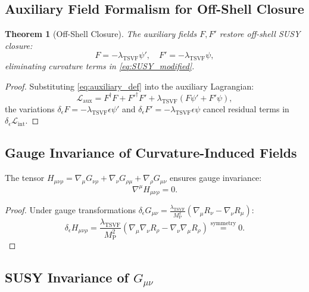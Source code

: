 \documentclass[12pt, onecolumn]{article}
\newtheorem{theorem}{Theorem}[section]
\theoremstyle{definition}
\newcommand{\tsvf}{\lambda_{\mathrm{TSVF}}}
\newcommand{\Mp}{M_{\mathrm{P}}}
\numberwithin{equation}{section}
\begin{document}
\subsection{Auxiliary Field Formalism for Off-Shell Closure} 
\label{subsec:auxiliary_fields}

\begin{theorem}[Off-Shell Closure]
\label{thm:off_shell}
The auxiliary fields \(F, F'\) restore off-shell SUSY closure:
\begin{equation}
F = -\tsvf \psi', \quad F' = -\tsvf \psi,
\label{eq:auxiliary_def}
\end{equation}
eliminating curvature terms in \eqref{eq:SUSY_modified}.
\end{theorem}

\begin{proof}
Substituting \eqref{eq:auxiliary_def} into the auxiliary Lagrangian:
\begin{equation}
\mathcal{L}_{\text{aux}} = F^\dagger F + F'^\dagger F' + \tsvf (F \psi' + F' \psi),
\label{eq:L_auxiliary}
\end{equation}
the variations \(\delta_\epsilon F = -\tsvf \epsilon \psi'\) and \(\delta_\epsilon F' = -\tsvf \epsilon \psi\) cancel residual terms in \(\delta_\epsilon \mathcal{L}_{\text{int}}\). \qedhere
\end{proof}

\subsection{Gauge Invariance of Curvature-Induced Fields} 
\label{subsec:H_gauge}

The tensor \(H_{\mu\nu\rho} = \nabla_\mu G_{\nu\rho} + \nabla_\nu G_{\rho\mu} + \nabla_\rho G_{\mu\nu}\) ensures gauge invariance:
\begin{equation}
\nabla^\mu H_{\mu\nu\rho} = 0.
\label{eq:H_constraint}
\end{equation}

\begin{proof}
Under gauge transformations \(\delta_\epsilon G_{\mu\nu} = \frac{\tsvf}{\Mp^2}(\nabla_\mu R_\nu - \nabla_\nu R_\mu)\):
\begin{equation}
\delta_\epsilon H_{\mu\nu\rho} = \frac{\tsvf}{\Mp^2} \left( \nabla_\mu \nabla_\nu R_\rho - \nabla_\nu \nabla_\mu R_\rho \right) \overset{\text{symmetry}}{=} 0.
\label{eq:H_gauge_inv}
\end{equation}
\end{proof}

\subsection{SUSY Invariance of \texorpdfstring{$G_{\mu\nu}$}{G}} 
\label{subsec:G_SUSY}
\end{document}
